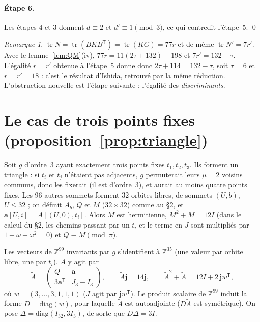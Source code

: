 \documentclass[11pt,a4paper]{article}
\theoremstyle{remark}
\newtheorem{remark}[theorem]{Remarque}
\newcommand{\Z}{\mathbb{Z}}
\newcommand{\one}{\mathbf{j}}
\newcommand{\tr}{\operatorname{tr}}
\begin{document}
\paragraph{Étape 6.} Les étapes 4 et 3 donnent $d\equiv 2$ et $d'\equiv 1\pmod 3$, ce qui contredit l'étape~5. \qed

\begin{remark}\label{rem:tau}
$\tr N=\tr(BKB^{\mathsf T})=\tr(KG)=77r$ et de même $\tr N'=7r'$. Avec le lemme~\ref{lem:QM}(iv), $77r=11(2\tau+132)-198$ et
$7r'=132-\tau$. L'égalité $r=r'$ obtenue à l'étape~5 donne donc $2\tau+114=132-\tau$, soit $\tau=6$ et $r=r'=18$ : c'est le
résultat d'Ishida, retrouvé par la même réduction. L'obstruction nouvelle est l'étape suivante : l'égalité des
\emph{discriminants}.
\end{remark}

\section{Le cas de trois points fixes (proposition~\ref{prop:triangle})}

Soit $g$ d'ordre~3 ayant exactement trois points fixes $t_1,t_2,t_3$. Ils forment un triangle : si $t_i$ et $t_j$ n'étaient pas
adjacents, $g$ permuterait leurs $\mu=2$ voisins communs, donc les fixerait (il est d'ordre~3), et aurait au moins quatre points
fixes. Les $96$ autres sommets forment $32$ orbites libres, de sommets $(U,b)$, $U\le32$ ; on définit $A_b$, $Q$ et $M$
($32\times32$) comme au §2, et $\mathbf a[U,i]=A[(U,0),t_i]$. Alors $M$ est hermitienne, $M^2+M=12I$ (dans le calcul du §2, les
chemins passant par un $t_i$ et le terme en $J$ sont multipliés par $1+\omega+\omega^2=0$) et $Q\equiv M\pmod\pi$.

Les vecteurs de $\Z^{99}$ invariants par $g$ s'identifient à $\Z^{35}$ (une valeur par orbite libre, une par $t_i$). $A$ y agit par
\[
\tilde A=\begin{pmatrix}Q&\mathbf a\\3\mathbf a^{\mathsf T}&J_3-I_3\end{pmatrix},\qquad
\tilde A\one=14\one,\qquad \tilde A^2+\tilde A=12I+2\,\one w^{\mathsf T},
\]
où $w=(3,\dots,3,1,1,1)$ ($J$ agit par $\one w^{\mathsf T}$). Le produit scalaire de $\Z^{99}$ induit la forme $D=\mathrm{diag}(w)$,
pour laquelle $\tilde A$ est autoadjointe ($D\tilde A$ est symétrique). On pose $\Delta=\mathrm{diag}(I_{32},3I_3)$, de sorte que
$D\Delta=3I$.
\end{document}
